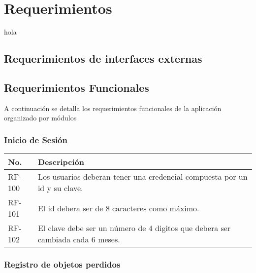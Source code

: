 \chapter{Requerimientos}
hola
\section{Requerimientos de interfaces externas}

\section{Requerimientos Funcionales}

A continuación se detalla los requerimientos funcionales de la aplicación organizado por módulos

\subsection{Inicio de Sesión}


	\begin{table}[h!]	
		\begin{tabular}{ |p{2cm}|p{12cm}| }	\hline
			
			\rowcolor{gray!50}  \textbf{No.}  &  \textbf{Descripción} \\ \hline
			
			RF-100&Los usuarios deberan tener una credencial compuesta por un id y su clave.  \\	\hline
			
			RF-101&El id debera ser de 8 caracteres como máximo.  \\ \hline
			
			RF-102&El clave debe ser un número de 4 digitos que debera ser cambiada cada 6 meses.  \\ \hline	
		
		\end{tabular}
	\end{table}	


\subsection{Registro de objetos perdidos}

